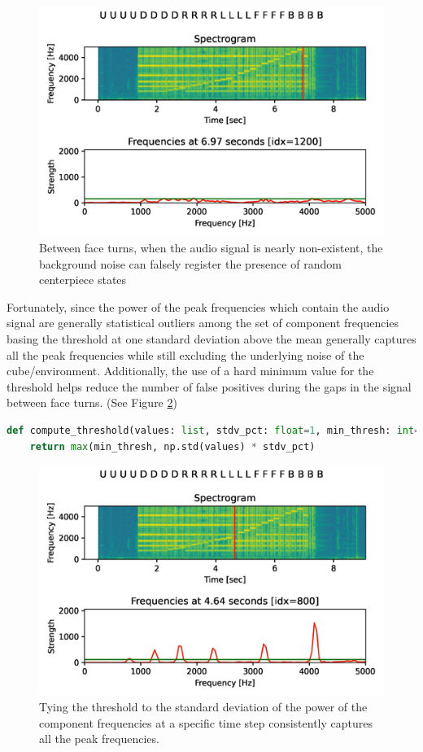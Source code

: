 \begin{figure}[h]
    \centering
    \includegraphics[width=0.8\linewidth]{Figures/5 Algorithm Design/threshold-false-positives.png}
    \caption{Between face turns, when the audio signal is nearly non-existent, the background noise can falsely register the presence of random centerpiece states}
    \label{fig:threshold-false-positives}
\end{figure}

Fortunately, since the power of the peak frequencies which contain the audio signal are generally statistical outliers among the set of component frequencies basing the threshold at one standard deviation above the mean generally captures all the peak frequencies while still excluding the underlying noise of the cube/environment. Additionally, the use of a hard minimum value for the threshold helps reduce the number of false positives during the gaps in the signal between face turns. (See Figure \ref{fig:threshold-refined})
\begin{lstlisting}[language=Python]
def compute_threshold(values: list, stdv_pct: float=1, min_thresh: int=50):
    return max(min_thresh, np.std(values) * stdv_pct)
\end{lstlisting}

\begin{figure}[h]
    \centering
    \includegraphics[width=0.8\linewidth]{Figures/5 Algorithm Design/threshold-refined.png}
    \caption{Tying the threshold to the standard deviation of the power of the component frequencies at a specific time step consistently captures all the peak frequencies.}
    \label{fig:threshold-refined}
\end{figure}

